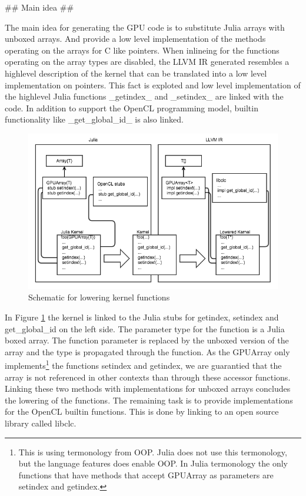 \begin{markdown}
## Main idea ##

The main idea for generating the GPU code is to substitute Julia
arrays with unboxed arrays. And provide a low level implementation of
the methods operating on the arrays for C like pointers. When
inlineing for the functions operating on the array types are disabled,
the LLVM IR generated resembles a highlevel description of the kernel
that can be translated into a low level implementation on
pointers. This fact is exploted and low level implementation of the
highlevel Julia functions _getindex_ and _setindex_ are linked with
the code. In addition to support the OpenCL programming model, builtin
functionality like _get_global_id_ is also linked.

\begin{figure}[H]
  \centering
  \includegraphics[width=1\textwidth]{body/figures/lowering_schematic.png}
  \caption{Schematic for lowering kernel functions}
  \label{fig:lowering}
\end{figure}

In Figure \ref{fig:lowering} the kernel is linked to the Julia stubs
for getindex, setindex and get_global_id on the left side. The
parameter type for the function is a Julia boxed array. The function
parameter is replaced by the unboxed version of the array and the type
is propagated through the function. As the GPUArray only
implements\footnote{This is using termonology from OOP. Julia does not
  use this termonology, but the language features does enable OOP. In
  Julia termonology the only functions that have methods that accept
  GPUArray as parameters are setindex and getindex.} the functions
setindex and getindex, we are guarantied that the array is not
referenced in other contexts than through these accessor functions.
Linking these two methods with implementations for unboxed arrays
concludes the lowering of the functions. The remaining task is to
provide implementations for the OpenCL builtin functions. This is done
by linking to an open source library called libclc.

  
\end{markdown}
